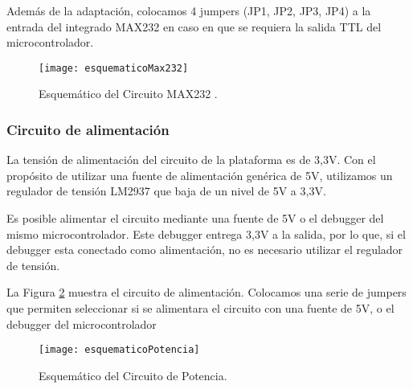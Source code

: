 Además de la adaptación, colocamos 4 jumpers (JP1, JP2, JP3, JP4) a la entrada del integrado MAX232 en caso en que se requiera la salida TTL del microcontrolador. \\

\begin{figure}[H]
  \centering
  \texttt{[image: esquematicoMax232]}
  \caption{Esquemático del Circuito MAX232 .}\label{fig:esquematicoMax232}
\end{figure}


\subsubsection{Circuito de alimentación}
\label{it3:ssub:circuito_de_alimentacion}

La tensión de alimentación del circuito de la plataforma es de 3,3V. Con el propósito de utilizar una fuente de alimentación genérica de 5V, utilizamos un regulador de tensión LM2937 que baja de un nivel de 5V a 3,3V.

Es posible alimentar el circuito mediante una fuente de 5V o el debugger del mismo microcontrolador. Este debugger entrega 3,3V a la salida, por lo que, si el debugger esta conectado como alimentación, no es necesario utilizar el regulador de tensión.

La Figura \ref{fig:esquematicoPotencia} muestra el circuito de alimentación. Colocamos una serie de jumpers que permiten seleccionar si se alimentara el circuito con una fuente de 5V, o el debugger del microcontrolador

\begin{figure}[H]
  \centering
  \texttt{[image: esquematicoPotencia]}
  \caption{Esquemático del Circuito de Potencia.}\label{fig:esquematicoPotencia}
\end{figure}



